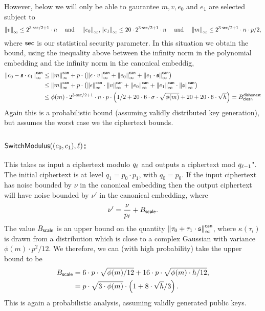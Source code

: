 \noindent
However, below we will only be able to gaurantee $m, v, e_0$ and $e_1$
are selected subject to
\[ {\Vert v \Vert}_\infty \le 2^{3 \cdot \mathsf{sec}/2+1} \cdot n \quad 
    \mbox{  and  } \quad
   {\Vert e_0 \Vert}_\infty, {\Vert e_1 \Vert}_\infty \le 20 \cdot 2^{3 \cdot \mathsf{sec}/2+1} \cdot n \quad
    \mbox{  and  } \quad
   {\Vert m \Vert}_\infty \le 2^{3 \cdot \mathsf{sec}/2+1} \cdot n \cdot p/2,
\]
where $\mathsf{sec}$ is our statistical security parameter.
In this situation we obtain the bound, using the inequality above
between the infinity norm in the polynomial embedding
and the infinity norm in the canonical embeddig,
\begin{align*}
 {\Vert c_0 - \mathfrak{s}\cdot c_1 \Vert}_\infty^{\mathsf{can}} 
   & \le  {\Vert m \Vert}_\infty^{\mathsf{can}} 
         +p \cdot \left( {\Vert \epsilon\cdot v \Vert}_\infty^{\mathsf{can}}
                       + {\Vert e_0 \Vert}_\infty^{\mathsf{can}}
                       + {\Vert e_1 \cdot \mathfrak{s} \Vert}_\infty^{\mathsf{can}}
                  \right) \\
   &\le  {\Vert m \Vert}_\infty^{\mathsf{can}} 
         +p \cdot \left( {\Vert \epsilon \Vert}_\infty^{\mathsf{can}} \cdot {\Vert  v \Vert}_\infty^{\mathsf{can}}
                       + {\Vert e_0 \Vert}_\infty^{\mathsf{can}}
                       + {\Vert e_1 \Vert}_\infty^{\mathsf{can}} \cdot {\Vert  \mathfrak{s}\Vert}_\infty^{\mathsf{can}}
                  \right)  \\
   &\le \phi(m) \cdot 2^{3 \cdot \mathsf{sec}/2+1} \cdot  n  \cdot p \cdot
	\left( 1/2 + 20 \cdot 6 \cdot \sigma \cdot \sqrt{\phi(m)}
		   + 20 
		   + 20 \cdot 6 \cdot \sqrt{h}
        \right) = B_{\mathsf{clean}}^{\mathsf{dishonest}}
\end{align*}
Again this is a probabilistic bound (assuming validly
distributed key generation), but assumes the worst case
we the ciphertext bounds.

\subsubsection{$\mathsf{SwitchModulus}((c_0,c_1),\ell)$:}
This takes as input a ciphertext modulo $q_\ell$ and outputs a ciphertext mod $q_{\ell-1}$".
The initial ciphertext is at level $q_1=p_0 \cdot p_1$, with $q_0=p_0$.
If the input ciphertext has noise bounded by $\nu$
in the canonical embedding
then the output ciphertext will have noise bounded by $\nu'$ in
the canonical embedding, where
\[ \nu' = \frac{\nu}{p_\ell} + B_{\mathsf{scale}}. \]
The value $B_{\mathsf{scale}}$ is an upper bound on the quantity
${\Vert \tau_0+\tau_1 \cdot \mathfrak{s} \Vert}_\infty^{\mathsf{can}}$, where
$\kappa(\tau_i)$ is drawn from a distribution
which is close to a complex Gaussian with variance $\phi(m)\cdot p^2/12$.
We therefore, we can (with high probability) take the upper
bound to be
\begin{align*}
    B_{\mathsf{scale}} 
	&= 6 \cdot p \cdot \sqrt{ \phi(m)/12}
	+ 16 \cdot p \cdot \sqrt{ \phi(m) \cdot h/12}, \\
        &= p \cdot \sqrt{3 \cdot \phi(m)} \cdot 
		\left( 1 + 8 \cdot \sqrt{h}/3 \right).
\end{align*}
This is again a probabilistic analysis, assuming validly generated
public keys.

